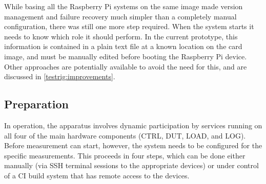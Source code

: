 While basing all the Raspberry Pi systems on the same image made version management and failure recovery much simpler than a completely manual configuration, there was still one more step required. When the system starts it needs to know which role it should perform. In the current prototype, this information is contained in a plain text file at a known location on the card image, and must be manually edited before booting the Raspberry Pi device. Other approaches are potentially available to avoid the need for this, and are discussed in \autoref{testrig:improvements}.

\subsection{Preparation}
\label{Preparation}

In operation, the apparatus involves dynamic participation by services running on all four of the main hardware components (CTRL, DUT, LOAD, and LOG). Before measurement can start, however, the system needs to be configured for the specific measurements. This proceeds in four steps, which can be done either manually (via SSH terminal sessions to the appropriate devices) or under control of a CI build system that has remote access to the devices.

